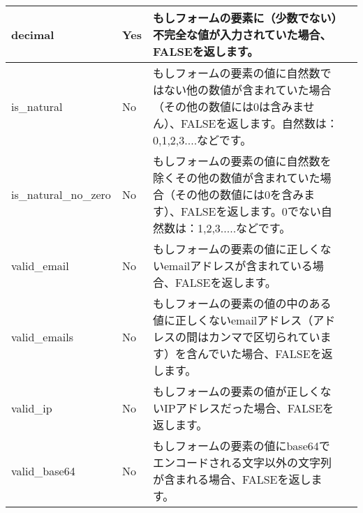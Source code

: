 \begin{longtable}{|l|l|l|l|}
decimal &	Yes &	もしフォームの要素に（少数でない）不完全な値が入力されていた場合、FALSEを返します。 	 & {}  \\ \hline
is\_natural &	No &	もしフォームの要素の値に自然数ではない他の数値が含まれていた場合（その他の数値には0は含みません）、FALSEを返します。自然数は：0,1,2,3....などです。 & {}  \\ \hline	 
is\_natural\_no\_zero &	No &	もしフォームの要素の値に自然数を除くその他の数値が含まれていた場合（その他の数値には0を含みます）、FALSEを返します。0でない自然数は：1,2,3.....などです。 	 & {}  \\ \hline
valid\_email &	No &	もしフォームの要素の値に正しくないemailアドレスが含まれている場合、FALSEを返します。 	& {}  \\ \hline 
valid\_emails &	No &	もしフォームの要素の値の中のある値に正しくないemailアドレス（アドレスの間はカンマで区切られています）を含んでいた場合、FALSEを返します。 & {}  \\ \hline	 
valid\_ip &	No &	もしフォームの要素の値が正しくないIPアドレスだった場合、FALSEを返します。 	 & {}  \\ \hline
valid\_base64 &	No &	もしフォームの要素の値にbase64でエンコードされる文字以外の文字列が含まれる場合、FALSEを返します。 	 & {}  \\ \hline
\end{longtable}

